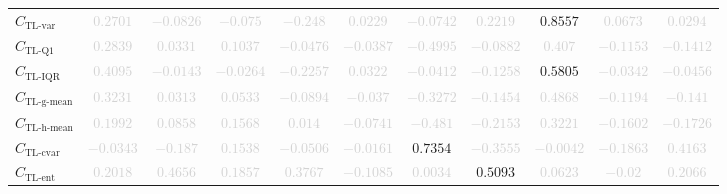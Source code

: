 \documentclass{standalone}
\newcommand{\tlvarname}{\text{TL-var}}
\newcommand{\tlvar}{C_{\tlvarname}}
\newcommand{\tlqonename}{\text{TL-Q1}}
\newcommand{\tlqone}{C_{\tlqonename}}
\newcommand{\tliqrname}{\text{TL-IQR}}
\newcommand{\tliqr}{C_{\tliqrname}}
\newcommand{\tlgmeanname}{\text{TL-g-mean}}
\newcommand{\tlgmean}{C_{\tlgmeanname}}
\newcommand{\tlhmeanname}{\text{TL-h-mean}}
\newcommand{\tlhmean}{C_{\tlhmeanname}}
\newcommand{\tlcvariationname}{\text{TL-cvar}}
\newcommand{\tlcvariation}{C_{\tlcvariationname}}
\newcommand{\tlentropyname}{\text{TL-ent}}
\newcommand{\tlentropy}{C_{\tlentropyname}}
\begin{document}
\begin{tabular}{lcccccccccc}
$\tlvar$ & \textcolor{lightgray}{$0.2701$} & \textcolor{lightgray}{$-0.0826$} & \textcolor{lightgray}{$-0.075$} & \textcolor{lightgray}{$-0.248$} & \textcolor{lightgray}{$0.0229$} & \textcolor{lightgray}{$-0.0742$} & \textcolor{lightgray}{$0.2219$} & $0.8557$ & \textcolor{lightgray}{$0.0673$} & \textcolor{lightgray}{$0.0294$} \\ 
$\tlqone$ & \textcolor{lightgray}{$0.2839$} & \textcolor{lightgray}{$0.0331$} & \textcolor{lightgray}{$0.1037$} & \textcolor{lightgray}{$-0.0476$} & \textcolor{lightgray}{$-0.0387$} & \textcolor{lightgray}{$-0.4995$} & \textcolor{lightgray}{$-0.0882$} & \textcolor{lightgray}{$0.407$} & \textcolor{lightgray}{$-0.1153$} & \textcolor{lightgray}{$-0.1412$} \\ 
$\tliqr$ & \textcolor{lightgray}{$0.4095$} & \textcolor{lightgray}{$-0.0143$} & \textcolor{lightgray}{$-0.0264$} & \textcolor{lightgray}{$-0.2257$} & \textcolor{lightgray}{$0.0322$} & \textcolor{lightgray}{$-0.0412$} & \textcolor{lightgray}{$-0.1258$} & $0.5805$ & \textcolor{lightgray}{$-0.0342$} & \textcolor{lightgray}{$-0.0456$} \\ 
$\tlgmean$ & \textcolor{lightgray}{$0.3231$} & \textcolor{lightgray}{$0.0313$} & \textcolor{lightgray}{$0.0533$} & \textcolor{lightgray}{$-0.0894$} & \textcolor{lightgray}{$-0.037$} & \textcolor{lightgray}{$-0.3272$} & \textcolor{lightgray}{$-0.1454$} & \textcolor{lightgray}{$0.4868$} & \textcolor{lightgray}{$-0.1194$} & \textcolor{lightgray}{$-0.141$} \\ 
$\tlhmean$ & \textcolor{lightgray}{$0.1992$} & \textcolor{lightgray}{$0.0858$} & \textcolor{lightgray}{$0.1568$} & \textcolor{lightgray}{$0.014$} & \textcolor{lightgray}{$-0.0741$} & \textcolor{lightgray}{$-0.481$} & \textcolor{lightgray}{$-0.2153$} & \textcolor{lightgray}{$0.3221$} & \textcolor{lightgray}{$-0.1602$} & \textcolor{lightgray}{$-0.1726$} \\ 
$\tlcvariation$ & \textcolor{lightgray}{$-0.0343$} & \textcolor{lightgray}{$-0.187$} & \textcolor{lightgray}{$0.1538$} & \textcolor{lightgray}{$-0.0506$} & \textcolor{lightgray}{$-0.0161$} & $0.7354$ & \textcolor{lightgray}{$-0.3555$} & \textcolor{lightgray}{$-0.0042$} & \textcolor{lightgray}{$-0.1863$} & \textcolor{lightgray}{$0.4163$} \\ 
$\tlentropy$ & \textcolor{lightgray}{$0.2018$} & \textcolor{lightgray}{$0.4656$} & \textcolor{lightgray}{$0.1857$} & \textcolor{lightgray}{$0.3767$} & \textcolor{lightgray}{$-0.1085$} & \textcolor{lightgray}{$0.0034$} & $0.5093$ & \textcolor{lightgray}{$0.0623$} & \textcolor{lightgray}{$-0.02$} & \textcolor{lightgray}{$0.2066$} \\ 

\end{tabular}
\end{document}
